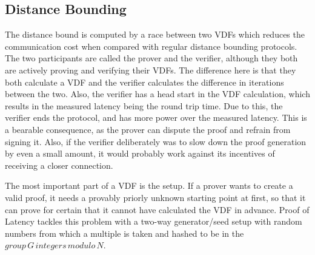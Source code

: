 \subsection{Distance Bounding}
The distance bound is computed by a race between two VDFs which reduces the communication cost when compared with regular distance bounding protocols. The two participants are called the prover and the verifier, although they both are actively proving and verifying their VDFs. The difference here is that they both calculate a VDF and the verifier calculates the difference in iterations between the two. Also, the verifier has a head start in the VDF calculation, which results in the measured latency being the round trip time. Due to this, the verifier ends the protocol, and has more power over the measured latency. This is a bearable consequence, as the prover can dispute the proof and refrain from signing it. Also, if the verifier deliberately was to slow down the proof generation by even a small amount, it would probably work against its incentives of receiving a closer connection.

The most important part of a VDF is the setup. If a prover wants to create a valid proof, it needs a provably priorly unknown starting point at first, so that it can prove for certain that it cannot have calculated the VDF in advance. Proof of Latency tackles this problem with a two-way generator/seed setup with random numbers from which a multiple is taken and hashed to be in the \(group\, G\, integers\, modulo\, N\).

